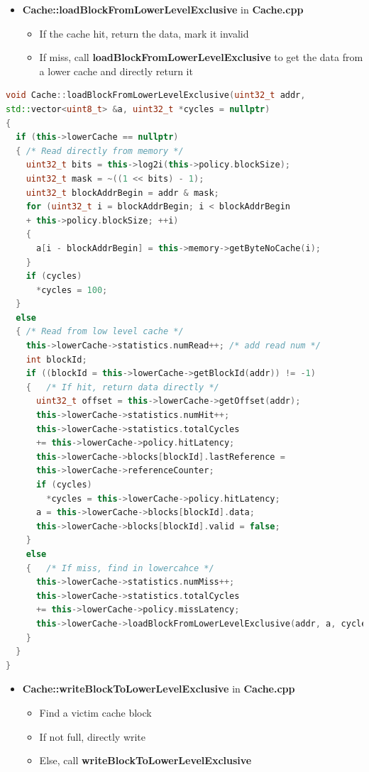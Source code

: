 \documentclass{article}
\begin{document}
\begin{itemize}
    \item \textbf{Cache::loadBlockFromLowerLevelExclusive} in \textbf{Cache.cpp}
        \begin{itemize}
            \item If the cache hit, return the data, mark it invalid
            \item If miss, call \textbf{loadBlockFromLowerLevelExclusive} to get the data from a lower cache and directly return it
        \end{itemize}
\end{itemize}
\begin{lstlisting}[language=c++]
void Cache::loadBlockFromLowerLevelExclusive(uint32_t addr, 
std::vector<uint8_t> &a, uint32_t *cycles = nullptr)
{
  if (this->lowerCache == nullptr)
  { /* Read directly from memory */
    uint32_t bits = this->log2i(this->policy.blockSize);
    uint32_t mask = ~((1 << bits) - 1);
    uint32_t blockAddrBegin = addr & mask;
    for (uint32_t i = blockAddrBegin; i < blockAddrBegin 
    + this->policy.blockSize; ++i)
    {
      a[i - blockAddrBegin] = this->memory->getByteNoCache(i);
    }
    if (cycles)
      *cycles = 100;
  }
  else
  { /* Read from low level cache */
    this->lowerCache->statistics.numRead++; /* add read num */
    int blockId;
    if ((blockId = this->lowerCache->getBlockId(addr)) != -1)
    {   /* If hit, return data directly */
      uint32_t offset = this->lowerCache->getOffset(addr);
      this->lowerCache->statistics.numHit++;
      this->lowerCache->statistics.totalCycles 
      += this->lowerCache->policy.hitLatency;
      this->lowerCache->blocks[blockId].lastReference =
      this->lowerCache->referenceCounter;
      if (cycles)
        *cycles = this->lowerCache->policy.hitLatency;
      a = this->lowerCache->blocks[blockId].data;
      this->lowerCache->blocks[blockId].valid = false;
    }
    else
    {   /* If miss, find in lowercahce */
      this->lowerCache->statistics.numMiss++;
      this->lowerCache->statistics.totalCycles 
      += this->lowerCache->policy.missLatency;
      this->lowerCache->loadBlockFromLowerLevelExclusive(addr, a, cycles);
    }
  }
}
\end{lstlisting}
\begin{itemize}
    \item \textbf{Cache::writeBlockToLowerLevelExclusive} in \textbf{Cache.cpp}
        \begin{itemize}
            \item Find a victim cache block
            \item If not full, directly write
            \item Else, call \textbf{writeBlockToLowerLevelExclusive}
        \end{itemize}
\end{itemize}
\end{document}
